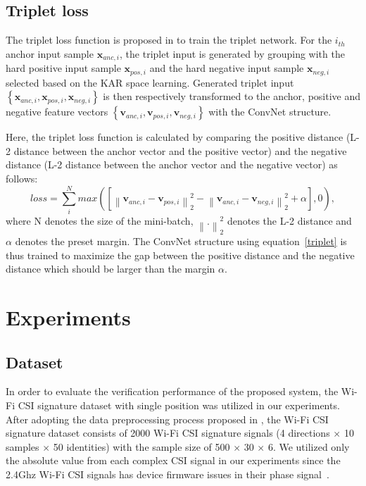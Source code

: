 \documentclass[runningheads]{llncs}
\begin{document}

\subsection{Triplet loss}

The triplet loss function is proposed in \cite{hoffer2015deep} to train the triplet network.
For the $i_{th}$ anchor input sample $\mathbf{x}_{anc,i}$, the triplet input is generated by grouping with the hard positive input sample $\mathbf{x}_{pos,i}$ and the hard negative input sample $\mathbf{x}_{neg,i}$ selected based on the KAR space learning. Generated triplet input $\left\{\mathbf{x}_{anc,i},\mathbf{x}_{pos,i},\mathbf{x}_{neg,i}\right\}$ is then respectively transformed to the anchor, positive and negative feature vectors $\left\{\mathbf{v}_{anc,i},\mathbf{v}_{pos,i},\mathbf{v}_{neg,i}\right\}$ with the ConvNet structure.

Here, the triplet loss function is calculated by comparing the positive distance (L-2 distance between the anchor vector and the positive vector) and the negative distance (L-2 distance between the anchor vector and the negative vector) as follows:
\begin{equation}
    loss = \sum_i^N max\left({ \left[ {\left\| {{\mathbf{v}_{anc,i}} - {\mathbf{v}_{pos,i}}} \right\|_2^2} - {\left\| {{\mathbf{v}_{anc,i}} - {\mathbf{v}_{neg,i}}} \right\|_2^2}  + \alpha \right]}, 0 \right),\label{triplet}
\end{equation} 
where N denotes the size of the mini-batch, ${\left\| . \right\|_2^2}$ denotes the L-2 distance and $\alpha$ denotes the preset margin.
The ConvNet structure using equation~\eqref{triplet} is thus trained to maximize the gap between the positive distance and the negative distance which should be larger than the margin $\alpha$.

\section{Experiments}

\subsection{Dataset}
 In order to evaluate the verification performance of the proposed system, the Wi-Fi CSI signature dataset \cite{moon2017air} with single position was utilized in our experiments. After adopting the data preprocessing process proposed in \cite{moon2017air}, the Wi-Fi CSI signature dataset consists of 2000 Wi-Fi CSI signature signals (4 directions $\times$ 10 samples $\times$ 50 identities) with the sample size of 500 $\times$ 30 $\times$ 6. We utilized only the absolute value from each complex CSI signal in our experiments since the 2.4Ghz Wi-Fi CSI signals has device firmware issues in their phase signal~\cite{wang2015understanding}.
\end{document}
